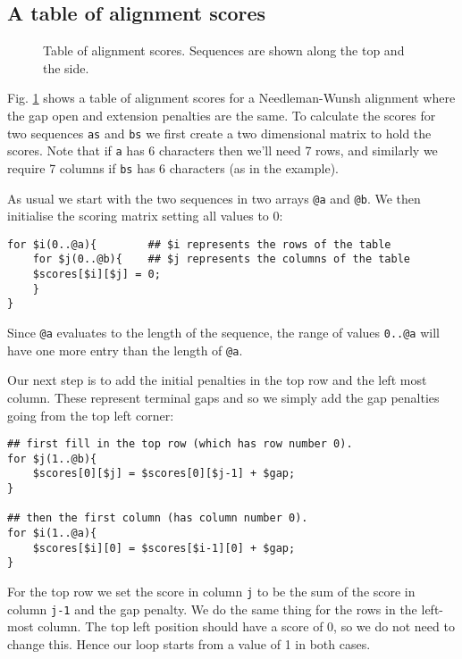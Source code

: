 \documentclass[11pt]{article}
\renewcommand\scriptsize\normalsize
\begin{document}
\subsection{A table of alignment scores}
\label{sec-1-1}

\begin{figure}[ht]
  \begin{tikzpicture}[scale=0.5]
    
  \end{tikzpicture}
  \caption{Table of alignment scores. Sequences are shown along the top and
    the side.}
  \label{scoreMatrix}
\end{figure}
Fig. \ref{scoreMatrix} shows a table of alignment scores for a Needleman-Wunsh alignment
where the gap open and extension penalties are the same. 
To 
calculate the scores for two sequences \texttt{as} and \texttt{bs} we first create a two dimensional matrix to hold the
scores. Note that if \texttt{a} has 6 characters then we'll need 7 rows, and
similarly we require 7 columns if \texttt{bs} has 6 characters (as in the example).

As usual we start with the two sequences in two arrays \texttt{@a} and
\texttt{@b}. We then initialise the scoring matrix setting all values to 0:

\begin{verbatim}
for $i(0..@a){        ## $i represents the rows of the table
    for $j(0..@b){    ## $j represents the columns of the table
	$scores[$i][$j] = 0;
    }
}
\end{verbatim}

Since \texttt{@a} evaluates to the length of the sequence, the range of
values \texttt{0..@a} will have one more entry than the length of \texttt{@a}.

Our next step is to add the initial penalties in the top row and the left most
column. These represent terminal gaps and so we simply add the gap penalties
going from the top left corner:

\begin{verbatim}
## first fill in the top row (which has row number 0).
for $j(1..@b){
    $scores[0][$j] = $scores[0][$j-1] + $gap;
}

## then the first column (has column number 0).
for $i(1..@a){
    $scores[$i][0] = $scores[$i-1][0] + $gap;
}
\end{verbatim}

For the top row we set the score in column \texttt{j} to be the sum
of the score in column \texttt{j-1} and the gap penalty. We do the same thing
for the rows in the left-most column. The top left position should have a
score of 0, so we do not need to change this. Hence our loop starts from a
value of 1 in both cases.
\end{document}
